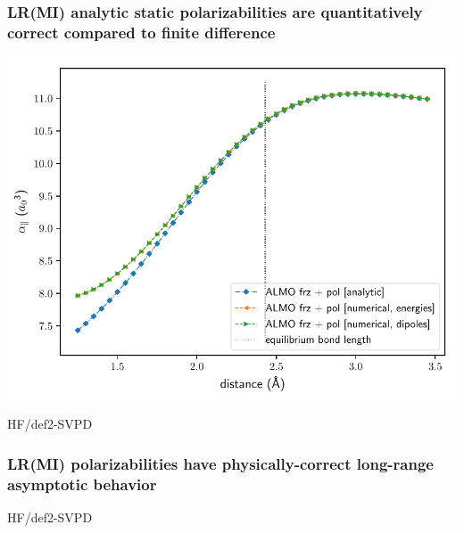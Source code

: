 \documentclass[%
    xcolor=usenames,dvipsnames,svgnames%
]{beamer}
\newenvironment{nscenter}
 {\parskip=0pt\par\nopagebreak\centering}
 {\par\noindent\ignorespacesafterend}
\begin{document}
\begin{frame}
  \frametitle{LR(MI) analytic static polarizabilities are quantitatively correct compared to finite difference}
  \begin{nscenter}
    \includegraphics[scale=0.65]{./figures/almo_analytic_vs_numerical_onaxis_projected_short_def2-SVPD.pdf}
  \end{nscenter}
  {\tiny HF/def2-SVPD}
\end{frame}

\begin{frame}
  \frametitle{LR(MI) polarizabilities have physically-correct long-range asymptotic behavior}
  {\tiny HF/def2-SVPD}
\end{frame}
\end{document}
